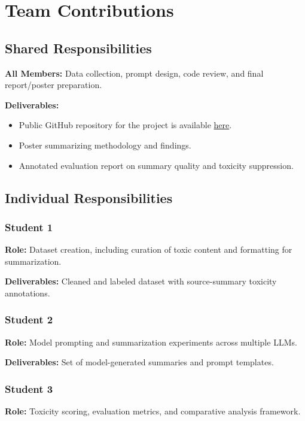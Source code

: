 \documentclass{article}
\begin{document}
\section{Team Contributions}

\subsection{Shared Responsibilities}

\textbf{All Members:} Data collection, prompt design, code review, and final report/poster preparation.

\noindent \textbf{Deliverables:}
\begin{itemize}
    \item Public GitHub repository for the project is available \href{https://github.com/arunimaCh29/Text-Summarisation-Eval#}{here}.
    \item Poster summarizing methodology and findings.
    \item Annotated evaluation report on summary quality and toxicity suppression.
\end{itemize}

\subsection{Individual Responsibilities}

\subsubsection{Student 1}
\textbf{Role:} Dataset creation, including curation of toxic content and formatting for summarization.

\textbf{Deliverables:} Cleaned and labeled dataset with source-summary toxicity annotations.

\subsubsection{Student 2}
\textbf{Role:} Model prompting and summarization experiments across multiple LLMs.

\textbf{Deliverables:} Set of model-generated summaries and prompt templates.

\subsubsection{Student 3}
\textbf{Role:} Toxicity scoring, evaluation metrics, and comparative analysis framework.
\end{document}
